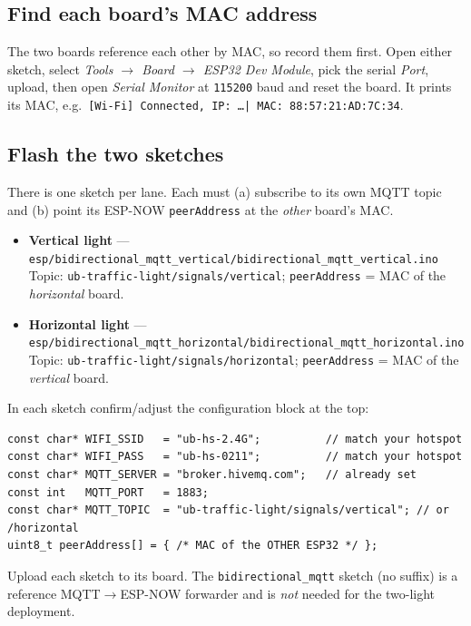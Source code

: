 \documentclass[11pt]{article}
\newcommand{\code}[1]{\texttt{#1}}
\begin{document}
\subsection{Find each board's MAC address}
The two boards reference each other by MAC, so record them first. Open either
sketch, select \emph{Tools $\rightarrow$ Board $\rightarrow$ ESP32 Dev Module},
pick the serial \emph{Port}, upload, then open \emph{Serial Monitor} at
\code{115200} baud and reset the board. It prints its MAC, e.g.\
\code{[Wi-Fi] Connected, IP: \ldots | MAC: 88:57:21:AD:7C:34}.

\subsection{Flash the two sketches}
There is one sketch per lane. Each must (a) subscribe to its own MQTT topic and
(b) point its ESP-NOW \code{peerAddress} at the \emph{other} board's MAC.

\begin{itemize}[nosep]
  \item \textbf{Vertical light} ---
        \code{esp/bidirectional\_mqtt\_vertical/bidirectional\_mqtt\_vertical.ino}\\
        Topic: \code{ub-traffic-light/signals/vertical};\quad
        \code{peerAddress} = MAC of the \emph{horizontal} board.
  \item \textbf{Horizontal light} ---
        \code{esp/bidirectional\_mqtt\_horizontal/bidirectional\_mqtt\_horizontal.ino}\\
        Topic: \code{ub-traffic-light/signals/horizontal};\quad
        \code{peerAddress} = MAC of the \emph{vertical} board.
\end{itemize}

\noindent In each sketch confirm/adjust the configuration block at the top:
\begin{lstlisting}
const char* WIFI_SSID   = "ub-hs-2.4G";          // match your hotspot
const char* WIFI_PASS   = "ub-hs-0211";          // match your hotspot
const char* MQTT_SERVER = "broker.hivemq.com";   // already set
const int   MQTT_PORT   = 1883;
const char* MQTT_TOPIC  = "ub-traffic-light/signals/vertical"; // or /horizontal
uint8_t peerAddress[] = { /* MAC of the OTHER ESP32 */ };
\end{lstlisting}
Upload each sketch to its board. The \code{bidirectional\_mqtt} sketch (no
suffix) is a reference MQTT$\rightarrow$ESP-NOW forwarder and is \emph{not}
needed for the two-light deployment.
\end{document}
